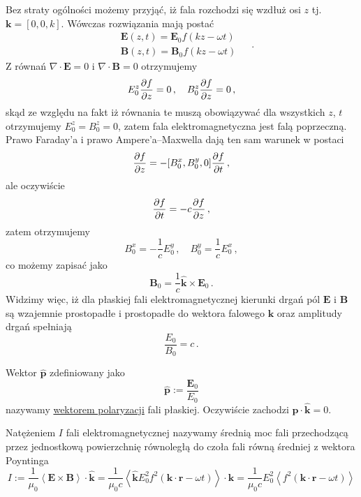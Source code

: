 \documentclass[../main.tex]{subfiles}
\begin{document}
Bez straty ogólności możemy przyjąć, iż fala rozchodzi się wzdłuż osi \(z\) tj.
\(\mathbf{k}=[0,0,k]\). Wówczas rozwiązania mają postać
\begin{equation*}
\begin{split}
    &\mathbf{E}(z,t)=\mathbf{E}_0f(kz-\omega t)\\
    &\mathbf{B}(z,t)=\mathbf{B}_0f(kz-\omega t)
\end{split}\quad\,.
\end{equation*}
Z równań \(\nabla\cdot\mathbf{E}=0\) i \(\nabla\cdot\mathbf{B}=0\) otrzymujemy
\begin{equation*}
    E_0^z\pdv{f}{z}=0\,,\quad B_0^z\pdv{f}{z}=0\,,
\end{equation*}
skąd ze względu na fakt iż równania te muszą obowiązywać dla wszystkich \(z\), \(t\) otrzymujemy
\(E_0^z=B_0^z=0\), zatem fala elektromagnetyczna jest falą poprzeczną. Prawo Faraday'a i prawo
Ampere'a--Maxwella dają ten sam warunek w postaci
\begin{equation*}
    [-E_0^y,E_0^x,0]\pdv{f}{z}=-[B_0^x,B_0^y,0]\pdv{f}{t}\,,
\end{equation*}
ale oczywiście
\begin{equation*}
    \pdv{f}{t}=-c\pdv{f}{z}\,,
\end{equation*}
zatem otrzymujemy
\begin{equation*}
    B_0^x=-\frac{1}{c}E_0^y\,,\quad B_0^y=\frac{1}{c}E_0^x\,,
\end{equation*}
co możemy zapisać jako
\begin{equation*}
    \mathbf{B}_0=\frac{1}{c}\mathbf{\hat{k}}\times\mathbf{E}_0\,.
\end{equation*}
Widzimy więc, iż dla płaskiej fali elektromagnetycznej kierunki drgań pól \(\mathbf{E}\) i
\(\mathbf{B}\) są wzajemnie prostopadłe i prostopadłe do wektora falowego \(\mathbf{k}\) oraz
amplitudy drgań spełniają
\begin{equation*}
    \frac{E_0}{B_0}=c\,.
\end{equation*}
\medskip

Wektor \(\mathbf{\hat{p}}\) zdefiniowany jako
\begin{equation*}
    \mathbf{\hat{p}}:=\frac{\mathbf{E}_0}{E_0}
\end{equation*}
nazywamy \underline{wektorem polaryzacji} fali płaskiej. Oczywiście zachodzi
\(\mathbf{\hat{p}}\cdot\mathbf{\hat{k}}=0\).
\medskip

Natężeniem \(I\) fali elektromagnetycznej nazywamy średnią moc fali przechodzącą przez jednostkową
powierzchnię równoległą do czoła fali równą średniej z wektora Poyntinga
\begin{equation*}
    I:=\frac{1}{\mu_0}\left\langle\mathbf{E}\times\mathbf{B}\right\rangle\cdot\mathbf{\hat{k}}=\frac{1}{\mu_0 c}\left\langle\mathbf{\hat{k}}E_0^2f^2(\mathbf{k}\cdot\mathbf{r}-\omega t)\right\rangle\cdot\mathbf{\hat{k}}=\frac{1}{\mu_0 c}E_0^2\left\langle f^2(\mathbf{k}\cdot\mathbf{r}-\omega t)\right\rangle
\end{equation*}
\end{document}
